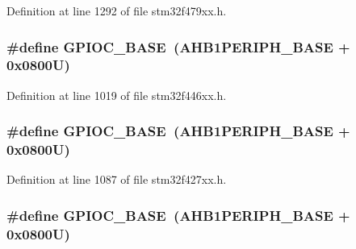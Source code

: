 Definition at line 1292 of file stm32f479xx.\+h.

\subsubsection[{\texorpdfstring{G\+P\+I\+O\+C\+\_\+\+B\+A\+SE}{GPIOC_BASE}}]{\setlength{\rightskip}{0pt plus 5cm}\#define G\+P\+I\+O\+C\+\_\+\+B\+A\+SE~({\bf A\+H\+B1\+P\+E\+R\+I\+P\+H\+\_\+\+B\+A\+SE} + 0x0800\+U)}\hypertarget{group___peripheral__memory__map_ga26f267dc35338eef219544c51f1e6b3f}{}\label{group___peripheral__memory__map_ga26f267dc35338eef219544c51f1e6b3f}


Definition at line 1019 of file stm32f446xx.\+h.

\subsubsection[{\texorpdfstring{G\+P\+I\+O\+C\+\_\+\+B\+A\+SE}{GPIOC_BASE}}]{\setlength{\rightskip}{0pt plus 5cm}\#define G\+P\+I\+O\+C\+\_\+\+B\+A\+SE~({\bf A\+H\+B1\+P\+E\+R\+I\+P\+H\+\_\+\+B\+A\+SE} + 0x0800\+U)}\hypertarget{group___peripheral__memory__map_ga26f267dc35338eef219544c51f1e6b3f}{}\label{group___peripheral__memory__map_ga26f267dc35338eef219544c51f1e6b3f}


Definition at line 1087 of file stm32f427xx.\+h.

\subsubsection[{\texorpdfstring{G\+P\+I\+O\+C\+\_\+\+B\+A\+SE}{GPIOC_BASE}}]{\setlength{\rightskip}{0pt plus 5cm}\#define G\+P\+I\+O\+C\+\_\+\+B\+A\+SE~({\bf A\+H\+B1\+P\+E\+R\+I\+P\+H\+\_\+\+B\+A\+SE} + 0x0800\+U)}\hypertarget{group___peripheral__memory__map_ga26f267dc35338eef219544c51f1e6b3f}{}\label{group___peripheral__memory__map_ga26f267dc35338eef219544c51f1e6b3f}


